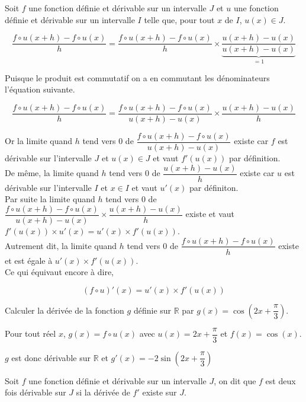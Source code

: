\documentclass[french]{book}
\newcommand{\R}{\mathbb {R}}
\begin{document}
\begin{demo}
Soit $f$ une fonction définie et dérivable sur un intervalle $J$ et $u$ une fonction définie et dérivable sur un intervalle $I$ telle que, pour tout $x$ de $I$, $u(x)\in J$.

$$\dfrac{f\circ u (x+h) - f\circ u (x)}{h} = \dfrac{f\circ u (x+h) - f\circ u (x)}{h} \times \underbrace{\dfrac{u(x+h)-u(x)}{u(x+h)-u(x)}}_{=1} $$
 
 Puisque le produit est commutatif on a en commutant les dénominateurs l'équation suivante. 
 
$$\dfrac{f\circ u (x+h) - f\circ u (x)}{h} = \dfrac{f\circ u (x+h) - f\circ u (x)}{u(x+h)-u(x)} \times \dfrac{u(x+h)-u(x)}{h} $$

Or la limite quand $h$ tend vers 0 de  $\dfrac{f\circ u (x+h) - f\circ u (x)}{u(x+h)-u(x)}$ existe car $f$ est dérivable sur l'intervalle $J$ et  $u(x)\in J$ et vaut $f'(u(x))$ par définition.\\

De même, la limite quand $h$ tend vers 0 de  $\dfrac{u(x+h)-u(x)}{h}$ existe car $u$ est dérivable sur l'intervalle $I$ et $x\in I$ et vaut $u'(x)$ par définiton.\\

Par suite la limite quand $h$ tend vers 0 de  $\dfrac{f\circ u (x+h) - f\circ u (x)}{u(x+h)-u(x)} \times \dfrac{u(x+h)-u(x)}{h}$ existe et vaut $f'(u(x)) \times u'(x) = u'(x)\times f'(u(x))$. \\ 

Autrement dit, la limite quand $h$ tend vers 0 de  $\dfrac{f\circ u (x+h) - f\circ u (x)}{h}$ existe et est égale à $u'(x)\times f'(u(x))$. \\

Ce qui équivaut encore à dire,

 $$ (f\circ u)'(x)=u'(x)\times f'(u(x))$$


\end{demo}



\begin{exemple}
Calculer la dérivée de la fonction $g$ définie sur $\R$ par $g(x)=\cos\left(2x+\dfrac{\pi}{3}\right)$.
\end{exemple}


Pour tout réel $x$, $g(x)=f\circ u (x)$ avec $u(x)=2x+\dfrac{\pi}{3}$ et $f(x)=\cos(x)$.

$g$ est donc dérivable sur $\R$ et $g'(x)=-2\sin\left(2x+\dfrac{\pi}{3}\right)$


\begin{defn}
Soit $f$ une fonction définie et dérivable sur un intervalle $J$, on dit que $f$ est deux fois dérivable sur $J$ si la dérivée de $f'$ existe sur $J$. 
\end{defn}
\end{document}
